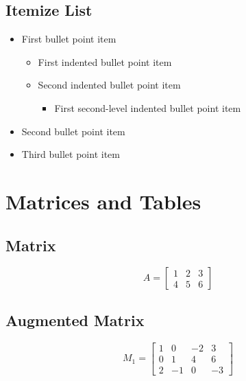\documentclass[
12pt, %
a4paper, %
fleqn,   %
]{notes}
\begin{document}
\subsection{Itemize List}
\begin{itemize}
    \item First bullet point item
        \begin{itemize}
            \item First indented bullet point item
            \item Second indented bullet point item
                \begin{itemize}
                    \item First second-level indented bullet point item
                \end{itemize}
        \end{itemize}
    \item Second bullet point item
    \item Third bullet point item
\end{itemize}


\newpage
\section{Matrices and Tables}


\subsection{Matrix}
\[
    A =
    \begin{bmatrix}
    1 & 2 & 3 \\
    4 & 5 & 6
    \end{bmatrix}
\]


\subsection{Augmented Matrix}
\[
    M_{1} =
    \left[
        \begin{array}{ccc|c}
        1 & 0 & -2 & 3 \\
        0 & 1 &  4 & 6 \\
        2 & -1 & 0 & -3
        \end{array}
    \right]
\]
\end{document}
